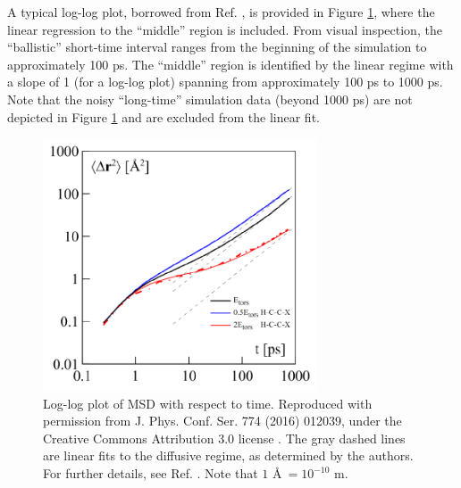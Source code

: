 \documentclass[9pt,bestpractices]{livecoms}
\begin{document}
A typical log-log plot, borrowed from Ref. \cite{Kondratyuk2016}, is provided in Figure \ref{fig:KondratyukFig2}, where the linear regression to the ``middle'' region is included. From visual inspection, the ``ballistic'' short-time interval ranges from the beginning of the simulation to approximately 100 ps. The ``middle'' region is identified by the linear regime with a slope of 1 (for a log-log plot) spanning from approximately 100 ps to 1000 ps. Note that the noisy ``long-time'' simulation data (beyond 1000 ps) are not depicted in Figure \ref{fig:KondratyukFig2} and are excluded from the linear fit.


\begin{figure}[htb!]
	\centering
	\includegraphics[width=3.2in]{KondratyukFig2.png}
	\caption{Log-log plot of MSD with respect to time. Reproduced with permission from J. Phys. Conf. Ser. 774 (2016) 012039, under the Creative Commons Attribution 3.0 license \cite{Kondratyuk2016}. The gray dashed lines are linear fits to the diffusive regime, as determined by the authors. For further details, see Ref. \cite{Kondratyuk2016}. Note that $1$ \AA $\ = 10^{-10}$ m.}%
	\label{fig:KondratyukFig2}
\end{figure}
\end{document}
